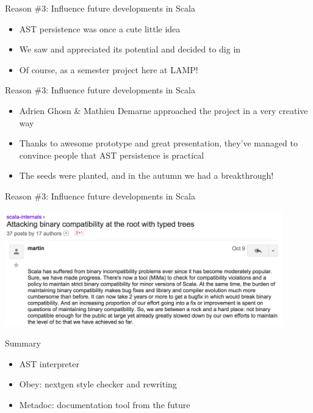 \documentclass[svgnames,dvipsnames,hyperref={bookmarks=false},usepdftitle=false]{beamer}
\begin{document}
\begin{frame}{Reason \#3: Influence future developments in Scala}
\begin{itemize}
\item AST persistence was once a cute little idea
\item We saw and appreciated its potential and decided to dig in
\item Of course, as a semester project here at LAMP!
\end{itemize}
\end{frame}

\begin{frame}{Reason \#3: Influence future developments in Scala}
\begin{itemize}
\item Adrien Ghosn \& Mathieu Demarne approached the project in a very creative way
\item \alert{Thanks to awesome prototype and great presentation, they've managed to convince people that AST persistence is practical}
\item The seeds were planted, and in the autumn we had a breakthrough!
\end{itemize}
\end{frame}

\begin{frame}[c, fragile]{Reason \#3: Influence future developments in Scala}
\begin{center}
\includegraphics[height=5cm]{martin.png}
\end{center}
\end{frame}


\begin{frame}{Summary}
\begin{itemize}
\item AST interpreter
\item Obey: nextgen style checker and rewriting
\item Metadoc: documentation tool from the future
\end{itemize}
\end{frame}
\end{document}
